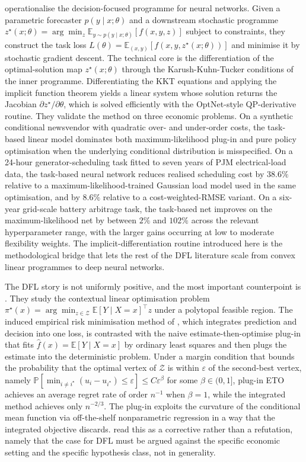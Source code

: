 \citet{DontiAmosKolter2017} operationalise the decision-focused programme for
neural networks. Given a parametric forecaster $p(y \mid x; \theta)$ and a
downstream stochastic programme $z^\star(x; \theta) = \arg\min_z
\mathbb E_{y \sim p(y \mid x; \theta)}[ f(x, y, z) ]$ subject to constraints, they
construct the task loss $L(\theta) = \mathbb E_{(x, y)}[ f(x, y, z^\star(x;
\theta)) ]$ and minimise it by stochastic gradient descent. The technical core is
the differentiation of the optimal-solution map $z^\star(x; \theta)$ through the
Karush-Kuhn-Tucker conditions of the inner programme. Differentiating the KKT
equations and applying the implicit function theorem yields a linear system whose
solution returns the Jacobian
$\partial z^\star / \partial \theta$, which is solved efficiently with the
OptNet-style QP-derivative routine. They validate the method on three economic
problems. On a synthetic conditional newsvendor with quadratic over- and
under-order costs, the task-based linear model dominates both maximum-likelihood
plug-in and pure policy optimisation when the underlying conditional distribution
is misspecified. On a 24-hour generator-scheduling task fitted to seven years of
PJM electrical-load data, the task-based neural network reduces realised
scheduling cost by $38.6\%$ relative to a maximum-likelihood-trained Gaussian
load model used in the same optimisation, and by $8.6\%$ relative to a
cost-weighted-RMSE variant. On a six-year grid-scale battery arbitrage task, the
task-based net improves on the maximum-likelihood net by between $2\%$ and $102\%$
across the relevant hyperparameter range, with the larger gains occurring at low
to moderate flexibility weights. The implicit-differentiation routine introduced
here is the methodological bridge that lets the rest of the DFL literature scale
from convex linear programmes to deep neural networks.

The DFL story is not uniformly positive, and the most important counterpoint is
\citet{HuKallus2020}. They study the contextual linear optimisation problem
$\pi^\star(x) = \arg\min_{z \in \mathcal Z} \mathbb E[Y \mid X = x]^\top z$ under
a polytopal feasible region. The induced empirical risk minimisation method of
\citet{ElmachtoubGrigas2022}, which integrates prediction and decision into one
loss, is contrasted with the naive estimate-then-optimise plug-in that fits
$\hat f(x) = \mathbb E[Y \mid X = x]$ by ordinary least squares and then plugs
the estimate into the deterministic problem. Under a margin condition that
bounds the probability that the optimal vertex of $\mathcal Z$ is within
$\varepsilon$ of the second-best vertex, namely
$\mathbb P[ \min_{i \ne i^\star} (u_i - u_{i^\star}) \le \varepsilon ] \le C
\varepsilon^\beta$ for some $\beta \in (0, 1]$, plug-in ETO achieves an average
regret rate of order $n^{-1}$ when $\beta = 1$, while the integrated method
achieves only $n^{-2/3}$. The plug-in exploits the curvature of the conditional
mean function via off-the-shelf nonparametric regression in a way that the
integrated objective discards. \citet{HuKallus2020} read this as a corrective
rather than a refutation, namely that the case for DFL must be argued against
the specific economic setting and the specific hypothesis class, not in
generality.

